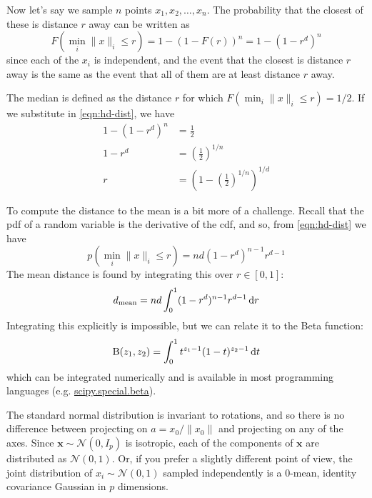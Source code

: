 Now let's say we sample $n$ points $x_1, x_2, \ldots, x_n$. The probability that the closest of these is distance $r$ away can be written as
\begin{equation}
F(\min_i \|x\|_i \leq r) = 1 - \left(1 - F(r)\right)^n = 1 - (1 - r^d)^n
\label{eqn:hd-dist}
\end{equation}
since each of the $x_i$ is independent, and the event that the closest is distance $r$ away is the same as the event that all of them are at least distance $r$ away.

The median is defined as the distance $r$ for which $F(\min_i \|x\|_i \leq r) = 1 / 2$. If we substitute in \eqref{eqn:hd-dist}, we have
\begin{align*}
  1 - (1 - r^d)^n &= \frac{1}{2}\\
  1 - r^d &= \left(\frac{1}{2}\right)^{1 / n}\\
  r &= \left(1 - \left(\frac{1}{2}\right)^{1 / n}\right)^{1 / d}
\end{align*}

To compute the distance to the mean is a bit more of a challenge. Recall that the pdf of a random variable is the derivative of the cdf, and so, from \eqref{eqn:hd-dist} we have
$$
p(\min_i \|x\|_i \leq r) = nd(1 - r^d)^{n-1} r^{d - 1}
$$
The mean distance is found by integrating this over $r\in [0, 1]$:
$$
d_{\mathrm{mean}} = nd \int_0^1 (1 - r^d)^{n-1} r^{d - 1} \operatorname{d}\!{r}
$$
Integrating this explicitly is impossible, but we can relate it to the Beta function:
$$
\mathrm{B}(z_1, z_2) = \int_0^1 t^{z_1 - 1} (1 - t)^{z_2 - 1}\operatorname{d}\!{t}
$$
which can be integrated numerically and is available in most programming languages (e.g. \href{https://docs.scipy.org/doc/scipy/reference/generated/scipy.special.beta.html}{scipy.special.beta}).

The standard normal distribution is invariant to rotations, and so there is no difference between projecting on $a = x_0 / \|x_0\|$ and projecting on any of the axes. Since $\mathbf{x} \sim \mathcal{N}(0, I_p)$ is isotropic, each of the components of $\mathbf{x}$ are distributed as $\mathcal{N}(0, 1)$. Or, if you prefer a slightly different point of view, the joint distribution of $x_i \sim \mathcal{N}(0, 1)$ sampled independently is a $0$-mean, identity covariance Gaussian in $p$ dimensions.

